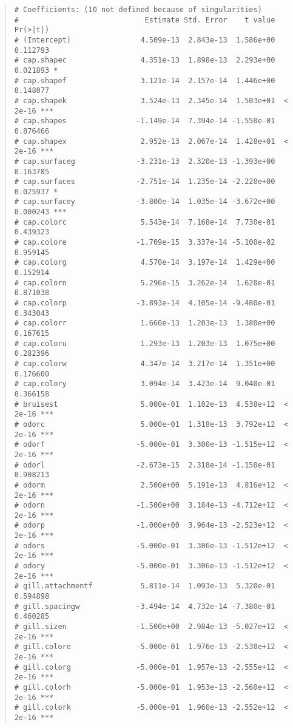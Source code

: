 \documentclass[12pt]{article}
\begin{document}
\begin{quote}
\begin{verbatim}
# Coefficients: (10 not defined because of singularities)
#                             Estimate Std. Error    t value Pr(>|t|)    
# (Intercept)                4.509e-13  2.843e-13  1.586e+00 0.112793    
# cap.shapec                 4.351e-13  1.898e-13  2.293e+00 0.021893 *  
# cap.shapef                 3.121e-14  2.157e-14  1.446e+00 0.148077    
# cap.shapek                 3.524e-13  2.345e-14  1.503e+01  < 2e-16 ***
# cap.shapes                -1.149e-14  7.394e-14 -1.550e-01 0.876466    
# cap.shapex                 2.952e-13  2.067e-14  1.428e+01  < 2e-16 ***
# cap.surfaceg              -3.231e-13  2.320e-13 -1.393e+00 0.163785    
# cap.surfaces              -2.751e-14  1.235e-14 -2.228e+00 0.025937 *  
# cap.surfacey              -3.800e-14  1.035e-14 -3.672e+00 0.000243 ***
# cap.colorc                 5.543e-14  7.168e-14  7.730e-01 0.439323    
# cap.colore                -1.709e-15  3.337e-14 -5.100e-02 0.959145    
# cap.colorg                 4.570e-14  3.197e-14  1.429e+00 0.152914    
# cap.colorn                 5.296e-15  3.262e-14  1.620e-01 0.871038    
# cap.colorp                -3.893e-14  4.105e-14 -9.480e-01 0.343043    
# cap.colorr                 1.660e-13  1.203e-13  1.380e+00 0.167615    
# cap.coloru                 1.293e-13  1.203e-13  1.075e+00 0.282396    
# cap.colorw                 4.347e-14  3.217e-14  1.351e+00 0.176600    
# cap.colory                 3.094e-14  3.423e-14  9.040e-01 0.366158    
# bruisest                   5.000e-01  1.102e-13  4.538e+12  < 2e-16 ***
# odorc                      5.000e-01  1.318e-13  3.792e+12  < 2e-16 ***
# odorf                     -5.000e-01  3.300e-13 -1.515e+12  < 2e-16 ***
# odorl                     -2.673e-15  2.318e-14 -1.150e-01 0.908213    
# odorm                      2.500e+00  5.191e-13  4.816e+12  < 2e-16 ***
# odorn                     -1.500e+00  3.184e-13 -4.712e+12  < 2e-16 ***
# odorp                     -1.000e+00  3.964e-13 -2.523e+12  < 2e-16 ***
# odors                     -5.000e-01  3.306e-13 -1.512e+12  < 2e-16 ***
# odory                     -5.000e-01  3.306e-13 -1.512e+12  < 2e-16 ***
# gill.attachmentf           5.811e-14  1.093e-13  5.320e-01 0.594898    
# gill.spacingw             -3.494e-14  4.732e-14 -7.380e-01 0.460285    
# gill.sizen                -1.500e+00  2.984e-13 -5.027e+12  < 2e-16 ***
# gill.colore               -5.000e-01  1.976e-13 -2.530e+12  < 2e-16 ***
# gill.colorg               -5.000e-01  1.957e-13 -2.555e+12  < 2e-16 ***
# gill.colorh               -5.000e-01  1.953e-13 -2.560e+12  < 2e-16 ***
# gill.colork               -5.000e-01  1.960e-13 -2.552e+12  < 2e-16 ***

\end{verbatim}
\end{quote}
\end{document}

